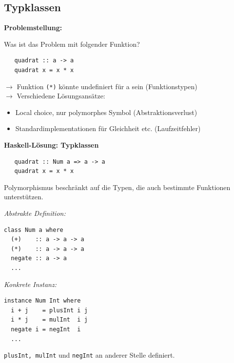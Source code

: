 \documentclass[unknownkeysallowed]{beamer}
\begin{document}
  \subsection{Typklassen}
  \begin{frame}[fragile]
  
  \Large\textbf{Problemstellung:}\bigskip \normalsize

  Was ist das Problem mit folgender Funktion?

  \begin{verbatim}
   quadrat :: a -> a
   quadrat x = x * x
  \end{verbatim}
  
  \bigskip
  \pause
  
  $\to$ Funktion \texttt{(*)} könnte undefiniert für a sein (Funktionstypen) \\ \pause
  $\to$ Verschiedene Lösungsansätze: \pause
  
  \begin{itemize}
  \item \glqq Local choice\grqq , nur polymorphes Symbol (Abstraktionsverlust) \pause
  \item Standardimplementationen für Gleichheit etc. (Laufzeitfehler)
  \end{itemize}
\end{frame}

  
  \begin{frame}[fragile]
  
  \Large\textbf{Haskell-Lösung: Typklassen} \normalsize

  \begin{verbatim}
   quadrat :: Num a => a -> a
   quadrat x = x * x
  \end{verbatim}
  
  Polymorphismus beschränkt auf die Typen, die auch bestimmte Funktionen unterstützen.\pause  
  \begin{multicols}{2}
  \emph{Abstrakte Definition:}
  
  \begin{verbatim}
class Num a where
  (+)    :: a -> a -> a
  (*)    :: a -> a -> a
  negate :: a -> a
  ...
  \end{verbatim}

  \vfill \vfill  
  
  \pause
  \columnbreak  
  \emph{Konkrete Instanz:}
  
  \begin{verbatim}
instance Num Int where
  i + j    = plusInt i j
  i * j    = mulInt  i j 
  negate i = negInt  i
  ... 
  \end{verbatim}
  \pause
  \texttt{plusInt, mulInt} und \texttt{negInt} an anderer Stelle definiert.
  \end{multicols}  
  
\end{frame}
\end{document}
